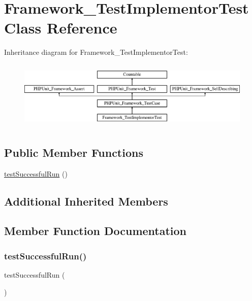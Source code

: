 \hypertarget{class_framework___test_implementor_test}{}\section{Framework\+\_\+\+Test\+Implementor\+Test Class Reference}
\label{class_framework___test_implementor_test}
Inheritance diagram for Framework\+\_\+\+Test\+Implementor\+Test\+:\begin{figure}[H]
\begin{center}
\leavevmode
\includegraphics[height=3.303835cm]{class_framework___test_implementor_test}
\end{center}
\end{figure}
\subsection*{Public Member Functions}
\begin{DoxyCompactItemize}
\item 
\mbox{\hyperlink{class_framework___test_implementor_test_a8a63f55e7c3628850565318f6787653a}{test\+Successful\+Run}} ()
\end{DoxyCompactItemize}
\subsection*{Additional Inherited Members}


\subsection{Member Function Documentation}
\mbox{\label{class_framework___test_implementor_test_a8a63f55e7c3628850565318f6787653a}} 
\subsubsection{\texorpdfstring{test\+Successful\+Run()}{testSuccessfulRun()}}
{\footnotesize\ttfamily test\+Successful\+Run (\begin{DoxyParamCaption}{ }\end{DoxyParamCaption})}



